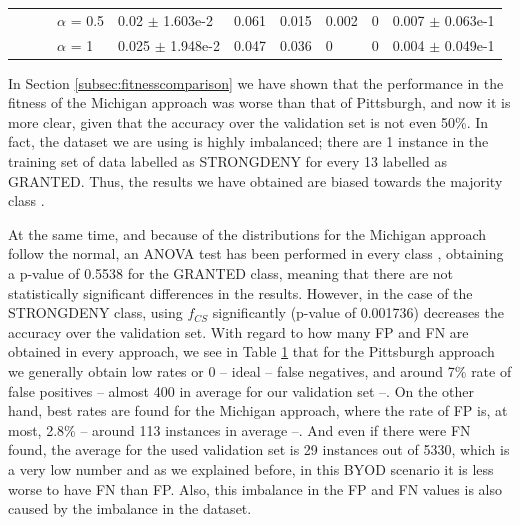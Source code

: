 \documentclass[runningheads]{llncs}
\begin{document}
\begin{table}[h!]
{\begin{tabular}{llll|l|l|l|l|l|l|}
			\multicolumn{1}{|l|}{}                                                                                             & \multicolumn{1}{l|}{}                                                                             & \multicolumn{1}{l|}{}                          & $\alpha$ = 0.5 & 0.02 $\pm$ 1.603e-2  & 0.061 & 0.015  & 0.002 & 0 & 0.007 $\pm$ 0.063e-1 \\ \cline{4-10} 
			\multicolumn{1}{|l|}{}                                                                                             & \multicolumn{1}{l|}{}                                                                             & \multicolumn{1}{l|}{}                          & $\alpha$ = 1   & 0.025 $\pm$ 1.948e-2 & 0.047 & 0.036  & 0     & 0 & 0.004 $\pm$ 0.049e-1 \\ \hline
		\end{tabular}
	}
	\label{tab:PvsMvalidation}
\end{table}

In Section \ref{subsec:fitnesscomparison} we have shown that the performance in the
fitness of the Michigan approach was worse than that of Pittsburgh,
and now it is more clear, given that the accuracy over the validation set is
not even 50\%. In fact, the dataset we are using is highly imbalanced; there are 1 instance
in the training set of data labelled as STRONGDENY for every 13
labelled as GRANTED. Thus, the results we have obtained are biased towards the majority
class \cite{japkowicz2002class}. 

At the same time, and because of the distributions for the Michigan approach follow the normal, an ANOVA test has been performed in every class \cite{DerracTests11}, obtaining a p-value of 0.5538 for the GRANTED class, meaning that there are not statistically significant differences in the results. However, in the case of the STRONGDENY class, using $f_{CS}$ significantly (p-value of 0.001736) decreases the accuracy over the validation set. With regard to how many FP and FN are obtained in every approach, we see in Table \ref{tab:PvsMvalidation} that for the Pittsburgh approach we generally obtain low rates or 0 -- ideal -- false negatives, and around 7\% rate of false positives -- almost 400 in average for our validation set --. On the other hand, best rates are found for the Michigan approach, where the rate of FP is, at most, 2.8\% -- around 113 instances in average --. And even if there were FN found, the average for the used validation set is 29 instances out of 5330, which is a very low number and as we explained before, in this BYOD scenario it is less worse to have FN than FP. Also, this imbalance in the FP and FN values is also caused by the imbalance in the dataset.
\end{document}
